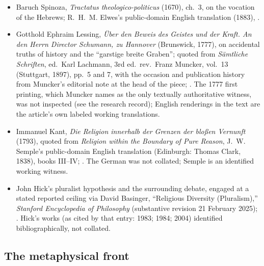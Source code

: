 {\fontsize{8.6}{9.6}\selectfont
\begin{itemize}[itemsep=0pt,parsep=0pt,topsep=0.05em]
\item Baruch Spinoza, \emph{Tractatus theologico-politicus} (1670), ch.~3, on the vocation of the Hebrews; R.~H.~M. Elwes's public-domain English translation (1883), .
\item Gotthold Ephraim Lessing, \emph{\"Uber den Beweis des Geistes und der Kraft. An den Herrn Director Schumann, zu Hannover} (Brunswick, 1777), on accidental truths of history and the ``garstige breite Graben''; quoted from \emph{S\"amtliche Schriften}, ed.\ Karl Lachmann, 3rd ed.\ rev.\ Franz Muncker, vol.~13 (Stuttgart, 1897), pp.~5 and 7, with the occasion and publication history from Muncker's editorial note at the head of the piece; . The 1777 first printing, which Muncker names as the only textually authoritative witness, was not inspected (see the research record); English renderings in the text are the article's own labeled working translations.
\item Immanuel Kant, \emph{Die Religion innerhalb der Grenzen der blo\ss{}en Vernunft} (1793), quoted from \emph{Religion within the Boundary of Pure Reason}, J.~W. Semple's public-domain English translation (Edinburgh: Thomas Clark, 1838), books III--IV; . The German was not collated; Semple is an identified working witness.
\item John Hick's pluralist hypothesis and the surrounding debate, engaged at a stated reported ceiling via David Basinger, ``Religious Diversity (Pluralism),'' \emph{Stanford Encyclopedia of Philosophy} (substantive revision 21 February 2025); . Hick's works (as cited by that entry: 1983; 1984; 2004) identified bibliographically, not collated.
\end{itemize}}

\subsection*{The metaphysical front}

